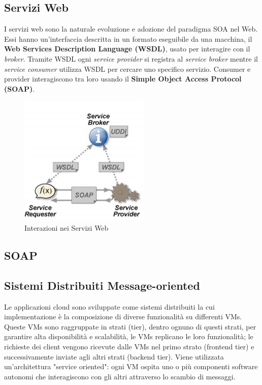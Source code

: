 \documentclass{article}
\begin{document}
\subsection{Servizi Web}
I servizi web sono la naturale evoluzione e adozione del paradigma SOA nel Web. Essi hanno un'interfaccia descritta in un formato eseguibile da una macchina, il \textbf{Web Services Description Language (WSDL)}, usato per interagire con il \textit{broker}. Tramite WSDL ogni \textit{service provider} si registra al \textit{service broker} mentre il \textit{service consumer} utilizza WSDL per cercare uno specifico servizio.
Consumer e provider interagiscono tra loro usando il \textbf{Simple Object Access Protocol (SOAP)}.
\begin{figure}[H]
\centering
\includegraphics{img/wsdl.png}
\caption{Interazioni nei Servizi Web}
\end{figure}

\subsection{SOAP}

\subsection{Sistemi Distribuiti Message-oriented}
Le applicazioni cloud sono sviluppate come sistemi distribuiti la cui implementazione è la composizione di diverse funzionalità su differenti VMs. Queste VMs sono raggruppate in strati (tier), dentro ognuno di questi strati, per garantire alta disponibilità e scalabilità, le VMs replicano le loro funzionalità; le richieste dei client vengono ricevute dalle VMs nel primo strato (frontend tier) e successivamente inviate agli altri strati (backend tier). 
Viene utilizzata un'architettura "service oriented": ogni VM ospita uno o più componenti software autonomi che interagiscono con gli altri attraverso lo scambio di messaggi.
\end{document}
